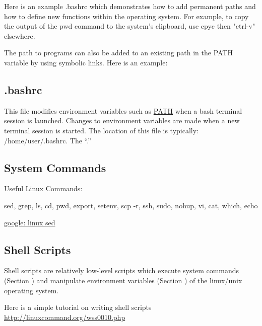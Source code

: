 Here is an example .bashrc which demonstrates how to add permanent paths 
and how to define new functions within the operating system. 
For example, to copy the output of the pwd command to the system's 
clipboard, use cpyc then "ctrl-v" elsewhere. 

The path to programs can also be added to an existing path in the PATH 
variable by using symbolic links.  Here is an example:

\subsection{.bashrc}

This file modifies environment variables such as 
\href{}{PATH}  
when a bash terminal session is launched. Changes to environment 
variables are made when a new terminal session is started. The 
location of this file is typically: /home/user/.bashrc.  The 
``.'' 

\subsection{System Commands}

Useful Linux Commands:

sed, grep, ls, cd, pwd, export, setenv, scp -r, ssh, sudo, nohup, 
vi, cat, which, echo

\href{https://www.google.com/search?q=linux+sed}
{google: linux sed}


\subsection{Shell Scripts}

Shell scripts are relatively low-level scripts which execute system 
commands (Section ) and 
manipulate environment variables (Section )   
of the linux/unix operating system. 

Here is a simple tutorial on writing shell scripts 
\href{http://linuxcommand.org/wss0010.php}
{http://linuxcommand.org/wss0010.php}

